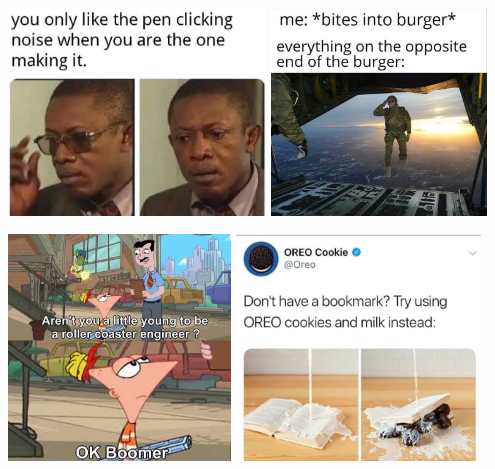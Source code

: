 \documentclass{article}
\begin{document}
\begin{center}

\includegraphics[height=5.5cm]{m1.jpeg}
\includegraphics[height=5.5cm]{m2.jpeg}
          
\includegraphics[height=6cm]{m3.jpeg}
\includegraphics[height=6cm]{m4.jpeg}
\end{center}
\end{document}
